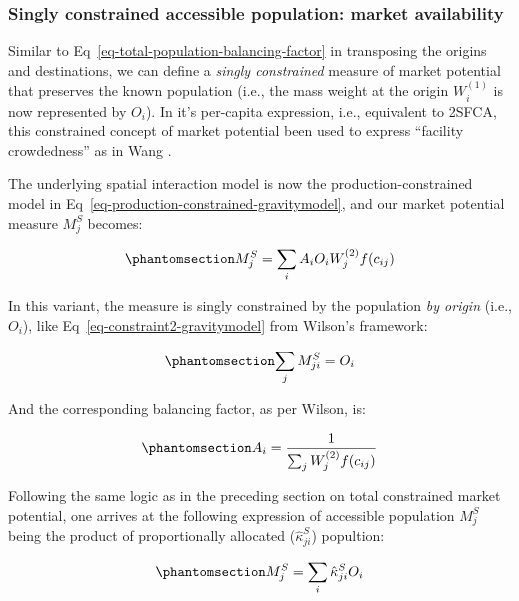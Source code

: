 \documentclass[
  10pt,
  letterpaper,
]{article}
\begin{document}
\subsubsection{Singly constrained accessible population: market
availability}\label{singly-constrained-accessible-population-market-availability}

Similar to Eq~\ref{eq-total-population-balancing-factor} in transposing
the origins and destinations, we can define a \emph{singly constrained}
measure of market potential that preserves the known population (i.e.,
the mass weight at the origin \(W_i^{(1)}\) is now represented by
\(O_i\)). In it's per-capita expression, i.e., equivalent to 2SFCA, this
constrained concept of market potential been used to express ``facility
crowdedness'' as in Wang \citep{wang_inverted_2018}.

The underlying spatial interaction model is now the
production-constrained model in
Eq~\ref{eq-production-constrained-gravitymodel}, and our market
potential measure \(M^S_j\) becomes:

\begin{equation}\phantomsection\label{eq-population-constrained-accessibility}{
M^S_j = \sum_i A_i O_i W_j^{(2)} f(c_{ij})
}\end{equation}

In this variant, the measure is singly constrained by the population
\emph{by origin} (i.e., \(O_i\)), like
Eq~\ref{eq-constraint2-gravitymodel} from Wilson's framework:

\begin{equation}\phantomsection\label{eq-population-constraint}{
\sum_j M^S_{ji} =  O_i 
}\end{equation}

And the corresponding balancing factor, as per Wilson, is:

\begin{equation}\phantomsection\label{eq-population-constrained-proportionality-constants}{
A_i = \frac{1}{\sum_j W_j^{(2)} f(c_{ij})}
}\end{equation}

Following the same logic as in the preceding section on total
constrained market potential, one arrives at the following expression of
accessible population \(M_j^S\) being the product of proportionally
allocated (\(\hat \kappa^S_{ji}\)) popultion:

\begin{equation}\phantomsection\label{eq-production-constrained-accessibility-with-proportional-allocation-factor}{
M^S_{j} = \sum_i \hat \kappa^S_{ji} O_i
}\end{equation}
\end{document}

